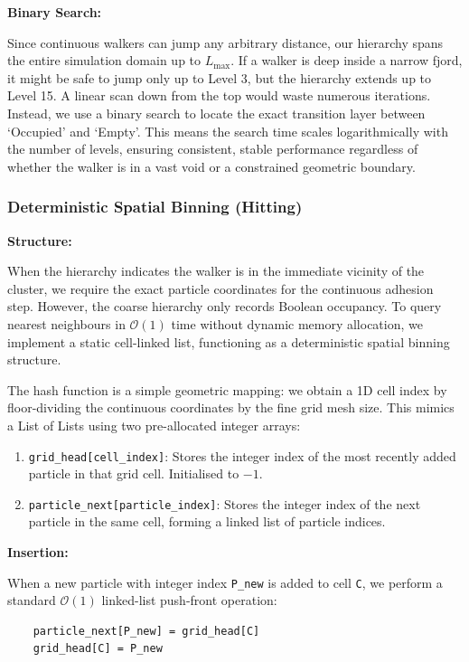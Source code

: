 \documentclass[12pt, a4paper, oneside]{report}
\theoremstyle{remark}
\begin{document}
\vspace{0.2em}
\noindent \textbf{Binary Search:} 

Since continuous walkers can jump any arbitrary distance, our hierarchy spans the entire simulation domain up to $L_{\text{max}}$. If a walker is deep inside a narrow fjord, it might be safe to jump only up to Level 3, but the hierarchy extends up to Level 15. A linear scan down from the top would waste numerous iterations. Instead, we use a binary search to locate the exact transition layer between `Occupied' and `Empty'. This means the search time scales logarithmically with the number of levels, ensuring consistent, stable performance regardless of whether the walker is in a vast void or a constrained geometric boundary.

\subsubsection{Deterministic Spatial Binning (Hitting)}
\noindent \textbf{Structure:} 

When the hierarchy indicates the walker is in the immediate vicinity of the cluster, we require the exact particle coordinates for the continuous adhesion step. However, the coarse hierarchy only records Boolean occupancy. To query nearest neighbours in $\mathcal{O}(1)$ time without dynamic memory allocation, we implement a static cell-linked list, functioning as a deterministic spatial binning structure.

The hash function is a simple geometric mapping: we obtain a 1D cell index by floor-dividing the continuous coordinates by the fine grid mesh size. This mimics a List of Lists using two pre-allocated integer arrays:
\begin{enumerate}
    \item \texttt{grid\_head[cell\_index]}: Stores the integer index of the most recently added particle in that grid cell. Initialised to $-1$.
    \item \texttt{particle\_next[particle\_index]}: Stores the integer index of the next particle in the same cell, forming a linked list of particle indices.
\end{enumerate}

\noindent \textbf{Insertion:}

When a new particle with integer index \texttt{P\_new} is added to cell \texttt{C}, we perform a standard $\mathcal{O}(1)$ linked-list push-front operation:
\begin{verbatim}
    particle_next[P_new] = grid_head[C]
    grid_head[C] = P_new
\end{verbatim}
\end{document}

